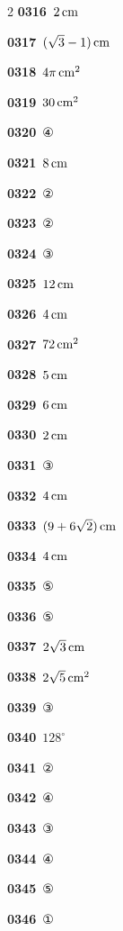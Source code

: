 \documentclass[10pt,a4paper]{article}
\begin{document}
\begin{multicols}{2}
\noindent\textbf{0316}\ $2\mkern3mu \mathrm{cm}$\par
\noindent\textbf{0317}\ $(\sqrt{3}-1)\mkern3mu \mathrm{cm}$\par
\noindent\textbf{0318}\ $4\pi\mkern3mu \mathrm{cm}^2$\par
\noindent\textbf{0319}\ $30\mkern3mu \mathrm{cm}^2$\par
\noindent\textbf{0320}\ ④\par
\noindent\textbf{0321}\ $8\mkern3mu \mathrm{cm}$\par
\noindent\textbf{0322}\ ②\par
\noindent\textbf{0323}\ ②\par
\noindent\textbf{0324}\ ③\par
\noindent\textbf{0325}\ $12\mkern3mu \mathrm{cm}$\par
\noindent\textbf{0326}\ $4\mkern3mu \mathrm{cm}$\par
\noindent\textbf{0327}\ $72\mkern3mu \mathrm{cm}^2$\par
\noindent\textbf{0328}\ $5\mkern3mu \mathrm{cm}$\par
\noindent\textbf{0329}\ $6\mkern3mu \mathrm{cm}$\par
\noindent\textbf{0330}\ $2\mkern3mu \mathrm{cm}$\par
\noindent\textbf{0331}\ ③\par
\noindent\textbf{0332}\ $4\mkern3mu \mathrm{cm}$\par
\noindent\textbf{0333}\ $(9+6\sqrt{2})\mkern3mu \mathrm{cm}$\par
\noindent\textbf{0334}\ $4\mkern3mu \mathrm{cm}$\par
\noindent\textbf{0335}\ ⑤\par
\noindent\textbf{0336}\ ⑤\par
\noindent\textbf{0337}\ $2\sqrt{3}\mkern3mu \mathrm{cm}$\par
\noindent\textbf{0338}\ $2\sqrt{5}\mkern3mu \mathrm{cm}^2$\par
\noindent\textbf{0339}\ ③\par
\noindent\textbf{0340}\ $128^\circ$\par
\noindent\textbf{0341}\ ②\par
\noindent\textbf{0342}\ ④\par
\noindent\textbf{0343}\ ③\par
\noindent\textbf{0344}\ ④\par
\noindent\textbf{0345}\ ⑤\par
\noindent\textbf{0346}\ ①\par

\end{multicols}
\end{document}
